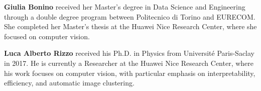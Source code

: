 \documentclass[12pt]{spieman}  %
\begin{document}
\begin{spacing}{2}
\begin{linenumbers}
\end{linenumbers}

\newpage


\vspace{2ex}\noindent\textbf{Giulia Bonino} received her Master’s degree in Data Science and Engineering through a double degree program between Politecnico di Torino and EURECOM. She completed her Master’s thesis at the Huawei Nice Research Center, where she focused on computer vision.


\vspace{2ex}\noindent\textbf{Luca Alberto Rizzo}  received his Ph.D. in Physics from Université Paris-Saclay in 2017. He is currently a Researcher at the Huawei Nice Research Center, where his work focuses on computer vision, with particular emphasis on interpretability, efficiency, and automatic image clustering.




















\listoffigures
\listoftables

\end{spacing}
\end{document}
